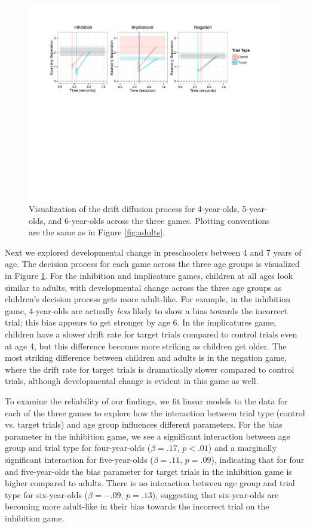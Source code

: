 \documentclass[10pt,letterpaper]{article}
\begin{document}
\begin{figure}
\begin{center} 
\includegraphics[width=6in]{figures/child_vis.pdf}
\caption{\label{fig:kids} Visualization of the drift diffusion process for 4-year-olds, 5-year-olds, and 6-year-olds across the three games.  Plotting conventions are the same as in Figure \ref{fig:adults}.}
\end{center} 
\end{figure}

Next we explored developmental change in preschoolers between 4 and 7 years of age.  The decision process for each game across the three age groups is visualized in Figure \ref{fig:kids}.  For the inhibition and implicature games, children at all ages look similar to adults, with developmental change across the three age groups as children's decision process gets more adult-like.  For example, in the inhibition game, 4-year-olds are actually \emph{less} likely to show a bias towards the incorrect trial; this bias appears to get stronger by age 6.  In the implicatures game, children have a slower drift rate for target trials compared to control trials even at age 4, but this difference becomes more striking as children get older.  The most striking difference between children and adults is in the negation game, where the drift rate for target trials is dramatically slower compared to control trials, although developmental change is evident in this game as well.  

To examine the reliability of our findings, we fit linear models to the data for each of the three games to explore how the interaction between trial type (control vs. target trials) and age group influences different parameters.  For the bias parameter in the inhibition game, we see a significant interaction between age group and trial type for four-year-olds ($\beta = .17$, $p< .01$) and a marginally significant interaction for five-year-olds ($\beta = .11$, $p = .09$), indicating that for four and five-year-olds the bias parameter for target trials in the inhibition game is higher compared to adults.  There is no interaction between age group and trial type for six-year-olds ($\beta = -.09$, $p = .13$), suggesting that six-year-olds are becoming more adult-like in their bias towards the incorrect trial on the inhibition game.
\end{document}
